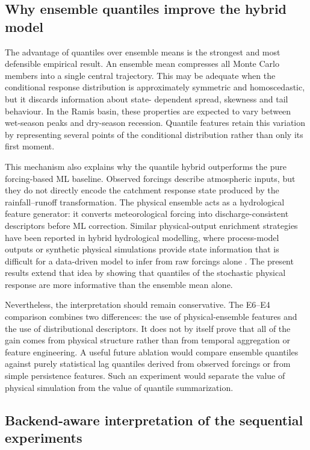 \documentclass[a4paper,fleqn]{cas-sc}
\begin{document}
\subsection{Why ensemble quantiles improve the hybrid model}
\label{subsec:discussion-hybrid}

The advantage of quantiles over ensemble means is the strongest and most defensible empirical result. An ensemble mean compresses all Monte Carlo members into a single central trajectory. This may be adequate when the conditional response distribution is approximately
symmetric and homoscedastic, but it discards information about state-
dependent spread, skewness and tail behaviour. In the Ramis basin,
these properties are expected to vary between wet-season peaks and
dry-season recession. Quantile features retain this variation by
representing several points of the conditional distribution rather than
only its first moment.

This mechanism also explains why the quantile hybrid outperforms the
pure forcing-based ML baseline. Observed forcings describe atmospheric
inputs, but they do not directly encode the catchment response state
produced by the rainfall--runoff transformation. The physical ensemble
acts as a hydrological feature generator: it converts meteorological
forcing into discharge-consistent descriptors before ML correction.
Similar physical-output enrichment strategies have been reported in
hybrid hydrological modelling, where process-model outputs or synthetic
physical simulations provide state information that is difficult for a
data-driven model to infer from raw forcings alone
\citep{mekonnen2015hybrid,yang2020physical,xie2021physics,li2024process,zhu2025hybrid}. The present results extend that idea by showing that
quantiles of the stochastic physical response are more informative than
the ensemble mean alone.

Nevertheless, the interpretation should remain conservative. The
E6--E4 comparison combines two differences: the use of physical-ensemble
features and the use of distributional descriptors. It does not by
itself prove that all of the gain comes from physical structure rather
than from temporal aggregation or feature engineering. A useful future
ablation would compare ensemble quantiles against purely statistical lag
quantiles derived from observed forcings or from simple persistence
features. Such an experiment would separate the value of physical
simulation from the value of quantile summarization.

\subsection{Backend-aware interpretation of the sequential experiments}
\label{subsec:discussion-backend}
\end{document}
